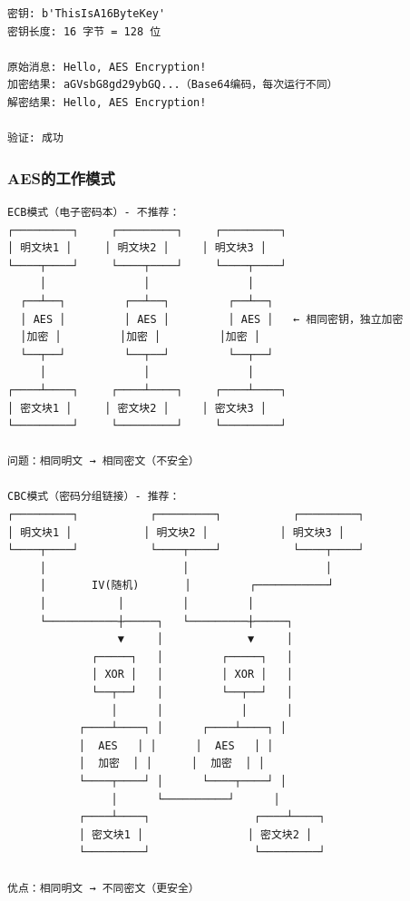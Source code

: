 \documentclass[12pt,a4paper]{article}
\begin{document}
\begin{notebox}[运行结果]
\begin{verbatim}
密钥: b'ThisIsA16ByteKey'
密钥长度: 16 字节 = 128 位

原始消息: Hello, AES Encryption!
加密结果: aGVsbG8gd29ybGQ...（Base64编码，每次运行不同）
解密结果: Hello, AES Encryption!

验证: 成功
\end{verbatim}
\end{notebox}

\subsubsection{AES的工作模式}

\begin{lstlisting}
ECB模式（电子密码本）- 不推荐：
┌─────────┐     ┌─────────┐     ┌─────────┐
│ 明文块1 │     │ 明文块2 │     │ 明文块3 │
└────┬────┘     └────┬────┘     └────┬────┘
     │               │               │
  ┌──┴──┐         ┌──┴──┐         ┌──┴──┐
  │ AES │         │ AES │         │ AES │   ← 相同密钥，独立加密
  │加密 │         │加密 │         │加密 │
  └──┬──┘         └──┬──┘         └──┬──┘
     │               │               │
┌────┴────┐     ┌────┴────┐     ┌────┴────┐
│ 密文块1 │     │ 密文块2 │     │ 密文块3 │
└─────────┘     └─────────┘     └─────────┘

问题：相同明文 → 相同密文（不安全）

CBC模式（密码分组链接）- 推荐：
┌─────────┐           ┌─────────┐           ┌─────────┐
│ 明文块1 │           │ 明文块2 │           │ 明文块3 │
└────┬────┘           └────┬────┘           └────┬────┘
     │                     │                     │
     │       IV(随机)       │         ┌───────────┘
     │           │         │         │
     └───────────┼─────┐   └─────────┼─────┐
                 ▼     │             ▼     │
             ┌─────┐   │         ┌─────┐   │
             │ XOR │   │         │ XOR │   │
             └──┬──┘   │         └──┬──┘   │
                │      │            │      │
           ┌────┴────┐ │      ┌────┴────┐ │
           │  AES   │ │      │  AES   │ │
           │  加密  │ │      │  加密  │ │
           └────┬────┘ │      └────┬────┘ │
                │      └──────────┘      │
           ┌────┴────┐                ┌────┴────┐
           │ 密文块1 │                │ 密文块2 │
           └─────────┘                └─────────┘

优点：相同明文 → 不同密文（更安全）
\end{lstlisting}
\end{document}
